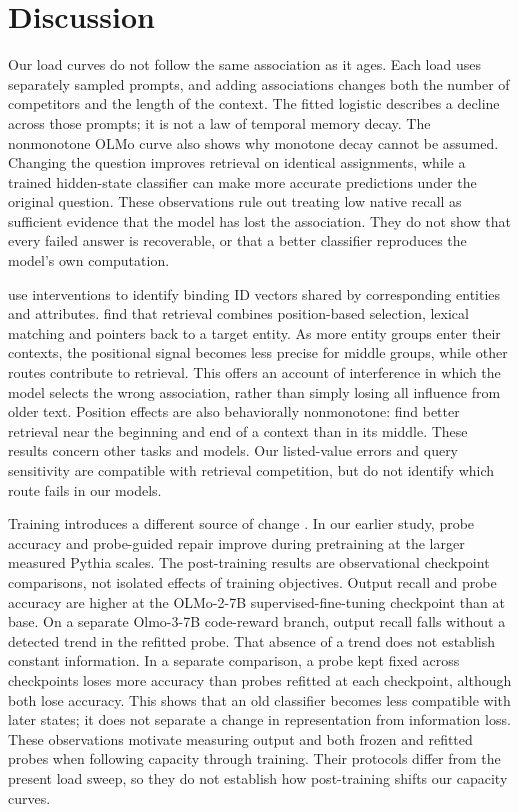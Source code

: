 \documentclass{article}
\begin{document}
\section{Discussion}\label{sec:use}
Our load curves do not follow the same association as it ages.
Each load uses separately sampled prompts, and adding associations changes both the number of competitors and the length of the context.
The fitted logistic describes a decline across those prompts; it is not a law of temporal memory decay.
The nonmonotone OLMo curve also shows why monotone decay cannot be assumed.
Changing the question improves retrieval on identical assignments, while a trained hidden-state classifier can make more accurate predictions under the original question.
These observations rule out treating low native recall as sufficient evidence that the model has lost the association.
They do not show that every failed answer is recoverable, or that a better classifier reproduces the model's own computation.

\citet{binding2310} use interventions to identify binding ID vectors shared by corresponding entities and attributes.
\citet{mixing2510} find that retrieval combines position-based selection, lexical matching and pointers back to a target entity.
As more entity groups enter their contexts, the positional signal becomes less precise for middle groups, while other routes contribute to retrieval.
This offers an account of interference in which the model selects the wrong association, rather than simply losing all influence from older text.
Position effects are also behaviorally nonmonotone: \citet{liu2024middle} find better retrieval near the beginning and end of a context than in its middle.
These results concern other tasks and models.
Our listed-value errors and query sensitivity are compatible with retrieval competition, but do not identify which route fails in our models.

Training introduces a different source of change \citep{decodable2609}.
In our earlier study, probe accuracy and probe-guided repair improve during pretraining at the larger measured Pythia scales.
The post-training results are observational checkpoint comparisons, not isolated effects of training objectives.
Output recall and probe accuracy are higher at the OLMo-2-7B supervised-fine-tuning checkpoint than at base.
On a separate Olmo-3-7B code-reward branch, output recall falls without a detected trend in the refitted probe.
That absence of a trend does not establish constant information.
In a separate comparison, a probe kept fixed across checkpoints loses more accuracy than probes refitted at each checkpoint, although both lose accuracy.
This shows that an old classifier becomes less compatible with later states; it does not separate a change in representation from information loss.
These observations motivate measuring output and both frozen and refitted probes when following capacity through training.
Their protocols differ from the present load sweep, so they do not establish how post-training shifts our capacity curves.
\end{document}
